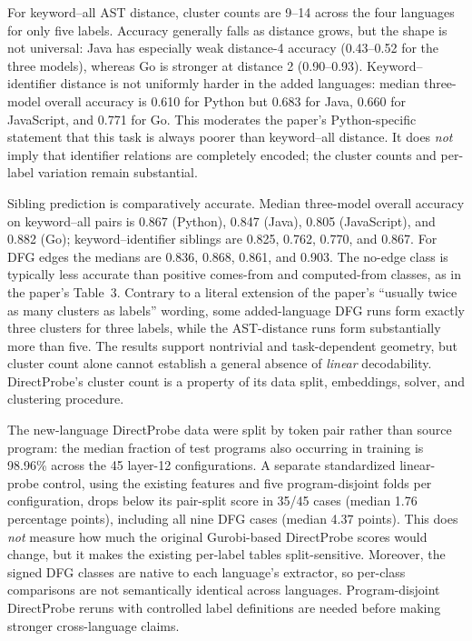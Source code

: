 \documentclass[11pt,a4paper]{article}
\begin{document}
For keyword--all AST distance, cluster counts are 9--14 across the four languages for only five labels. Accuracy generally falls as distance grows, but the shape is not universal: Java has especially weak distance-4 accuracy (0.43--0.52 for the three models), whereas Go is stronger at distance 2 (0.90--0.93). Keyword--identifier distance is not uniformly harder in the added languages: median three-model overall accuracy is 0.610 for Python but 0.683 for Java, 0.660 for JavaScript, and 0.771 for Go. This moderates the paper's Python-specific statement that this task is always poorer than keyword--all distance. It does \emph{not} imply that identifier relations are completely encoded; the cluster counts and per-label variation remain substantial.

Sibling prediction is comparatively accurate. Median three-model overall accuracy on keyword--all pairs is 0.867 (Python), 0.847 (Java), 0.805 (JavaScript), and 0.882 (Go); keyword--identifier siblings are 0.825, 0.762, 0.770, and 0.867. For DFG edges the medians are 0.836, 0.868, 0.861, and 0.903. The no-edge class is typically less accurate than positive comes-from and computed-from classes, as in the paper's Table~3. Contrary to a literal extension of the paper's ``usually twice as many clusters as labels'' wording, some added-language DFG runs form exactly three clusters for three labels, while the AST-distance runs form substantially more than five. The results support nontrivial and task-dependent geometry, but cluster count alone cannot establish a general absence of \emph{linear} decodability. DirectProbe's cluster count is a property of its data split, embeddings, solver, and clustering procedure.

The new-language DirectProbe data were split by token pair rather than source program: the median fraction of test programs also occurring in training is 98.96\% across the 45 layer-12 configurations. A separate standardized linear-probe control, using the existing features and five program-disjoint folds per configuration, drops below its pair-split score in 35/45 cases (median 1.76 percentage points), including all nine DFG cases (median 4.37 points). This does \emph{not} measure how much the original Gurobi-based DirectProbe scores would change, but it makes the existing per-label tables split-sensitive. Moreover, the signed DFG classes are native to each language's extractor, so per-class comparisons are not semantically identical across languages. Program-disjoint DirectProbe reruns with controlled label definitions are needed before making stronger cross-language claims.
\end{document}
